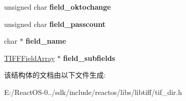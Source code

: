 \begin{DoxyCompactItemize}
unsigned char {\bfseries field\+\_\+oktochange}
\item 
\mbox{\label{struct___t_i_f_f_field_a23fb8b260b51a13de1d2d7cd3312694b}} 
unsigned char {\bfseries field\+\_\+passcount}
\item 
\mbox{\label{struct___t_i_f_f_field_a342e7d76d6c2dcfc842b06e4580a55b9}} 
char $\ast$ {\bfseries field\+\_\+name}
\item 
\mbox{\label{struct___t_i_f_f_field_ad62f5cd7c68b144a46ab0f6f60e3e9e8}} 
\hyperlink{struct___t_i_f_f_field_array}{T\+I\+F\+F\+Field\+Array} $\ast$ {\bfseries field\+\_\+subfields}
\end{DoxyCompactItemize}


该结构体的文档由以下文件生成\+:\begin{DoxyCompactItemize}
\item 
E\+:/\+React\+O\+S-\/0../sdk/include/reactos/libs/libtiff/tif\+\_\+dir.\+h\end{DoxyCompactItemize}
